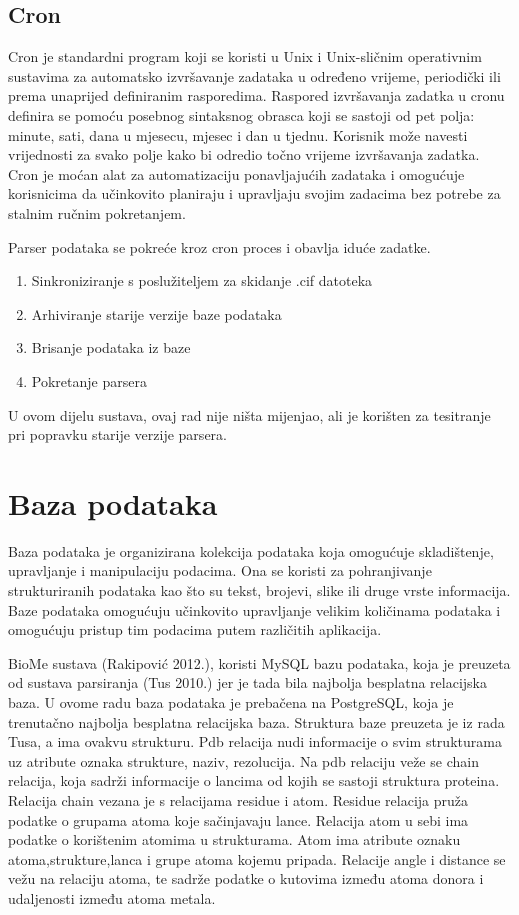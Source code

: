 \documentclass[times, utf8, zavrsni]{fer}
\begin{document}
\subsection{Cron}
Cron je standardni program koji se koristi u Unix i Unix-sličnim operativnim sustavima za automatsko izvršavanje zadataka u određeno vrijeme, periodički ili prema unaprijed definiranim rasporedima. 
Raspored izvršavanja zadatka u cronu definira se pomoću posebnog sintaksnog obrasca koji se sastoji od pet polja: minute, sati, dana u mjesecu, mjesec i dan u tjednu. Korisnik može navesti vrijednosti za svako polje kako bi odredio točno vrijeme izvršavanja zadatka. Cron je moćan alat za automatizaciju ponavljajućih zadataka i omogućuje korisnicima da učinkovito planiraju i upravljaju svojim zadacima bez potrebe za stalnim ručnim pokretanjem.

Parser podataka se pokreće kroz cron proces i obavlja iduće zadatke.

 	\begin{enumerate}
               \item  Sinkroniziranje s poslužiteljem za skidanje .cif datoteka
                \item   Arhiviranje starije verzije baze podataka
	      \item   Brisanje podataka iz baze
                \item    Pokretanje parsera
                \end{enumerate}
U ovom dijelu sustava, ovaj rad nije ništa mijenjao, ali je korišten za tesitranje pri popravku starije verzije parsera.

\section{Baza podataka}
  Baza podataka je organizirana kolekcija podataka koja omogućuje skladištenje, upravljanje i manipulaciju podacima. Ona se koristi za pohranjivanje strukturiranih  podataka kao što su tekst, brojevi, slike ili druge vrste informacija.
Baze podataka omogućuju učinkovito upravljanje velikim količinama podataka i omogućuju pristup tim podacima putem različitih aplikacija.

 BioMe sustava (Rakipović 2012.), koristi MySQL bazu podataka, koja je preuzeta od sustava parsiranja (Tus 2010.) jer je tada bila najbolja besplatna relacijska baza. U ovome radu baza podataka je prebačena na PostgreSQL, koja je trenutačno najbolja besplatna relacijska baza. Struktura baze preuzeta je iz rada
Tusa, a ima ovakvu strukturu. Pdb relacija nudi informacije  o svim strukturama uz atribute oznaka strukture, naziv, rezolucija.
 Na pdb relaciju veže se chain relacija, koja sadrži informacije o lancima  od kojih se sastoji struktura proteina. 
Relacija chain vezana je s relacijama residue i atom. Residue relacija pruža podatke o grupama atoma koje sačinjavaju lance.
 Relacija atom u sebi ima podatke o korištenim atomima u strukturama.
 Atom ima atribute oznaku atoma,strukture,lanca i grupe atoma kojemu pripada.
 Relacije angle i distance se vežu na relaciju atoma, te sadrže podatke o kutovima između atoma donora i udaljenosti između atoma metala.
\end{document}
